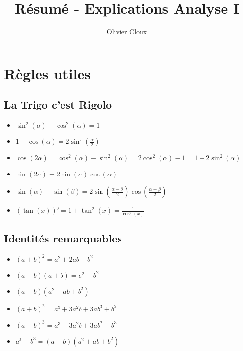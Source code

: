 \documentclass[12pt,a4paper]{article}
\title{Résumé - Explications Analyse I}
\author{Olivier Cloux}
\begin{document}
\maketitle
\tableofcontents

\section{Règles utiles}
\subsection{La Trigo c'est Rigolo}
\begin{itemize}
	\item $\sin^2(\alpha) + \cos^2(\alpha) = 1$
	\item $1-\cos(\alpha) = 2\sin^2(\frac{\alpha}{2})$
	\item $\cos(2\alpha) = \cos^2(\alpha) - \sin^2(\alpha) = 2\cos^2(\alpha)-1 = 1-2\sin^2(\alpha)$
	\item $\sin(2\alpha) = 2\sin(\alpha)\cos(\alpha)$
	\item $\sin(\alpha) - \sin(\beta) = 2\sin(\frac{\alpha-\beta}{2})\cos(\frac{\alpha+\beta}{2})$
	\item $(\tan(x))' = 1+\tan^2(x) = \frac{1}{\cos^2(x)}$
\end{itemize}
\subsection{Identités remarquables}
\begin{itemize}
	\item $(a+b)^2 = a^2 + 2ab + b^2$
	\item $(a-b)(a+b) = a^2-b^2$
	\item $(a-b)(a^2 + ab + b^2)$
	\item $(a+b)^3 = a^3 + 3a^2b+3ab^3+b^3$
	\item $(a-b)^3 = a^3- 3a^2b+3ab^2-b^3$
	\item $a^3-b^3 = (a-b)(a^2+ab+b^2)$
\end{itemize}
\end{document}
